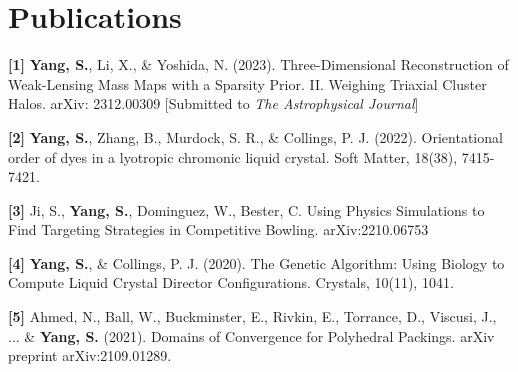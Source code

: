 \documentclass[letterpaper,11pt]{article}
\newcommand{\resumeSubHeadingListStart}{\begin{itemize}[leftmargin=0.15in, label={}]}
\newcommand{\resumeSubHeadingListEnd}{\end{itemize}}
\begin{document}
\section{Publications}
  \vspace{3pt}
  \resumeSubHeadingListStart
    \small{\item{
        \textbf{[1]}{ \textbf{Yang, S.}, Li, X., \& Yoshida, N. (2023). Three-Dimensional Reconstruction of Weak-Lensing Mass Maps with a Sparsity Prior. II. Weighing Triaxial Cluster Halos. arXiv: 2312.00309 [Submitted to \textit{The Astrophysical Journal}]}

    
        \textbf{[2]}{ \textbf{Yang, S.}, Zhang, B., Murdock, S. R., \& Collings, P. J. (2022). Orientational order of dyes in a lyotropic chromonic liquid crystal. Soft Matter, 18(38), 7415-7421. } \\ \vspace{3pt}

        \textbf{[3]}{ Ji, S., \textbf{Yang, S.}, Dominguez, W., Bester, C. Using Physics Simulations to Find Targeting Strategies in Competitive Bowling. arXiv:2210.06753}
        
        \textbf{[4]}{ \textbf{Yang, S.}, \& Collings, P. J. (2020). The Genetic Algorithm: Using Biology to Compute Liquid Crystal Director Configurations. Crystals, 10(11), 1041. } \\ \vspace{3pt}
    
        \textbf{[5]}{ Ahmed, N., Ball, W., Buckminster, E., Rivkin, E., Torrance, D., Viscusi, J., ... \& \textbf{Yang, S.} (2021). Domains of Convergence for Polyhedral Packings. arXiv preprint arXiv:2109.01289.} \\ \vspace{3pt}
        
        
        
        
    }}
  \resumeSubHeadingListEnd
  
\end{document}
